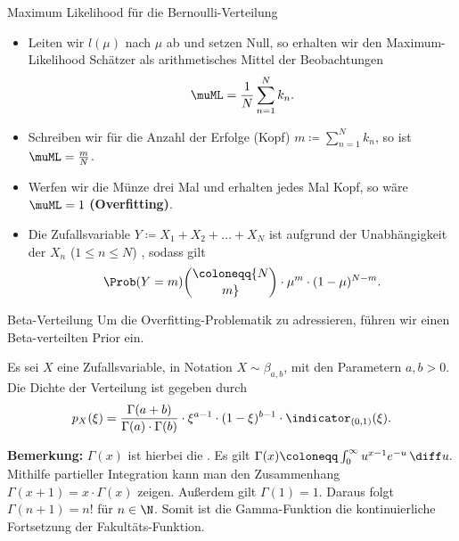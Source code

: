 \begin{frame}{Maximum Likelihood für die Bernoulli-Verteilung}{}
	\begin{itemize}
		\item Leiten wir $l(\mu)$ nach $\mu$ ab und setzen Null, so erhalten wir den Maximum-Likelihood Schätzer als
			arithmetisches Mittel der Beobachtungen
		\begin{equation*}
			\muML = \frac{1}{N} \sum_{n=1}^N k_n.
		\end{equation*}
		\item Schreiben wir für die Anzahl der Erfolge (Kopf) $m \coloneqq \sum_{n=1}^N k_n$, so ist $\muML = \frac{m}{N}$.
		\item Werfen wir die Münze drei Mal und erhalten jedes Mal Kopf, so wäre $\muML = 1$ \textbf{(Overfitting)}.
		\item Die Zufallsvariable $Y \coloneqq X_1 + X_2 + \ldots + X_N$ ist aufgrund der Unabhängigkeit der $X_n$
			($1 \le n \le N$) , sodass gilt
		\begin{equation*}
			\Prob(Y = m) \coloneqq {N \choose m} \cdot \mu^m \cdot (1 - \mu)^{N - m}.
		\end{equation*}
	\end{itemize}
\end{frame}


\begin{frame}{Beta-Verteilung}{}
	Um die Overfitting-Problematik zu adressieren, führen wir einen Beta-verteilten Prior ein.
	
	\begin{mydef}
		Es sei $X$ eine  Zufallsvariable, in Notation $X \sim \beta_{a, b}$, mit den Parametern
		$a, b > 0$. Die Dichte der Verteilung ist gegeben durch
		\begin{equation*}
			p_X(\xi)
				= \frac{\Gamma(a + b)}{\Gamma(a) \cdot \Gamma(b)}
					\cdot \xi^{a - 1} \cdot (1 - \xi)^{b - 1} \cdot \indicator_{(0, 1)}(\xi).
		\end{equation*}
	\end{mydef}
	
	\begin{boxGray}
		\textbf{Bemerkung:} $\Gamma(x)$ ist hierbei die . Es gilt
		$\Gamma(x) \coloneqq \int_0^\infty u^{x-1} e^{-u}\,\diff u.$ Mithilfe partieller Integration kann man den Zusammenhang
		$\Gamma(x + 1) = x \cdot \Gamma(x)$ zeigen. Außerdem gilt $\Gamma(1) = 1$. Daraus folgt $\Gamma(n + 1) = n!$ für
		$n \in \N$. Somit ist die Gamma-Funktion die kontinuierliche Fortsetzung der Fakultäts-Funktion.
	\end{boxGray}
\end{frame}


